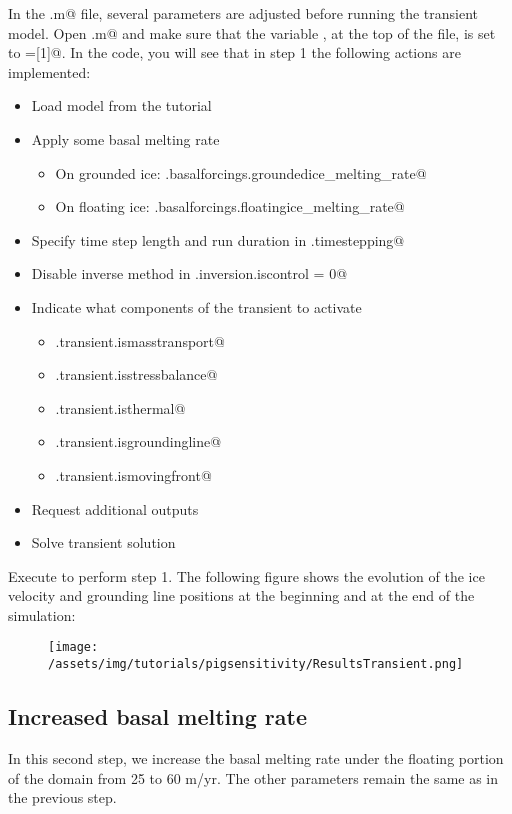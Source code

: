 In the \verb@runme.m@ file, several parameters are adjusted before running the transient model. Open \verb@runme.m@ and make sure that the variable \verb@steps@, at the top of the file, is set to \verb@steps=[1]@. In the code, you will see that in step 1 the following actions are implemented:
\begin{itemize}
	\item Load model from the \verb@Pig@ tutorial
	\item Apply some basal melting rate
		\begin{itemize}
			\item On grounded ice: \verb@md.basalforcings.groundedice_melting_rate@
			\item On floating ice: \verb@md.basalforcings.floatingice_melting_rate@
		\end{itemize}
	\item Specify time step length and run duration in \verb@md.timestepping@
	\item Disable inverse method in \verb@md.inversion.iscontrol = 0@
	\item Indicate what components of the transient to activate
		\begin{itemize}
			\item \verb@md.transient.ismasstransport@
			\item \verb@md.transient.isstressbalance@
			\item \verb@md.transient.isthermal@
			\item \verb@md.transient.isgroundingline@
			\item \verb@md.transient.ismovingfront@
		\end{itemize}
	\item Request additional outputs
	\item Solve transient solution
\end{itemize}

Execute \verb@runme@ to perform step 1. The following figure shows the evolution of the ice velocity and grounding line positions at the beginning and at the end of the simulation:
\begin{figure}[H]
	\begin{center}
		\texttt{[image: /assets/img/tutorials/pigsensitivity/ResultsTransient.png]}
	\end{center}
\end{figure}
\subsection{Increased basal melting rate}%
In this second step, we increase the basal melting rate under the floating portion of the domain from 25 to 60 m/yr. The other parameters remain the same as in the previous step.

